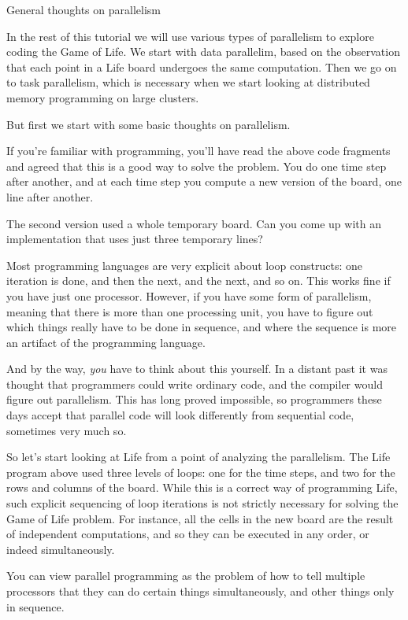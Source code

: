  {General thoughts on parallelism}

In the rest of this tutorial we will use various types of parallelism
to explore coding the Game of Life. We start with data parallelim,
based on the observation that each point in a Life board undergoes the
same computation. Then we go on to task parallelism, which is necessary
when we start
looking at distributed memory programming on large clusters.

But first we start with some basic thoughts on parallelism.

If you're familiar with programming, you'll have read the 
above code fragments and agreed that this is a good way to 
solve the problem. You do one time step after another, and
at each time step you compute 
a new version of the board, one line after another.

\begin{exercise}
  The second version used a whole temporary board. Can you come
  up with an implementation that uses just three temporary lines?
\end{exercise}

Most programming languages are very explicit about loop constructs: 
one iteration is done, and then the next, and the next, and so on.
This works fine if you 
have just one processor. However, if you have some form of parallelism,
meaning that there is more than one processing unit, you have to 
figure out which things really have to be done in sequence,
and where the sequence is more an artifact of the programming language.

And by the way, \emph{you} have to think about this yourself.
In a distant past it was thought that programmers could write
ordinary code, and the compiler would figure out parallelism. This has
long proved impossible, so programmers these days accept that parallel
code will look differently from sequential code, sometimes very much so.

So let's start looking at Life from a point of analyzing the parallelism.
The Life program above used three levels of loops: one for the time steps,
and two for the rows and columns of the board. While this is a correct
way of programming Life,
such explicit sequencing of loop iterations
is not strictly necessary for solving the  Game of Life problem. 
For instance,
all the cells in the new board are 
the result of independent computations, and so they
can be executed in any order, or indeed simultaneously.

You can view parallel programming as the problem of how to tell 
multiple processors that they can do certain things simultaneously,
and other things only in sequence.

